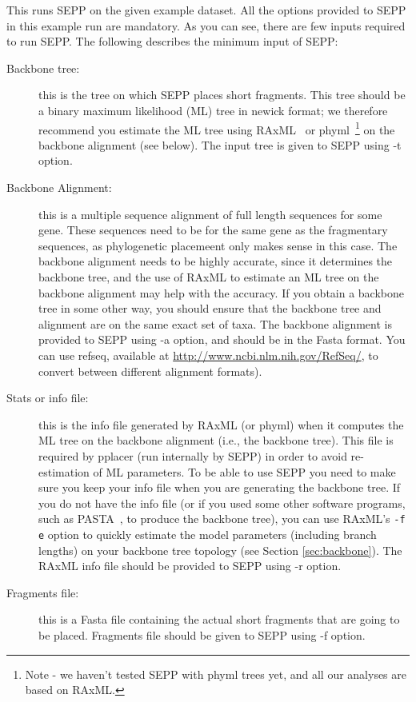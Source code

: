 \documentclass[11pt]{article} %
\newcommand{\sepp}{SEPP\xspace}
\newcommand{\ins}[1]{{\tt #1}}
\newcommand{\raxml}{RAxML\xspace}
\begin{document}
This runs \sepp on the given example dataset. All the options provided to \sepp in this example run are mandatory. As you can see, there are few inputs required to run \sepp. The following describes the minimum input of \sepp:
\begin {description}
\item[Backbone tree:] this is the tree on which \sepp places short fragments. 
This tree should be a binary maximum likelihood (ML) tree
in newick format; we therefore recommend you estimate
the ML tree  using \raxml~\cite{raxml} or phyml~\cite{phyml}\footnote{Note - we 
haven't tested \sepp with phyml trees yet, and all our analyses are
based on RAxML.}  on the backbone alignment (see below). The 
input tree is given to \sepp using -t option.
\item[Backbone Alignment:] this is a multiple sequence alignment 
of full length sequences for some gene. These sequences need to
be for the same gene as the fragmentary sequences, as phylogenetic
placemeent only makes sense in this case.  The backbone 
alignment needs to be highly accurate, since it determines the backbone
tree, and the use of RAxML to estimate an ML tree on the
backbone alignment may help with the accuracy.  If you obtain a
backbone tree in some other way, you should ensure that the
backbone tree and alignment  are on the same exact set of taxa.
The backbone alignment is provided to \sepp using -a option, and should be in 
the Fasta format. You can use  refseq, available  at 
\url{http://www.ncbi.nlm.nih.gov/RefSeq/}, to convert  between different alignment formats). 
\item[Stats or info file:] this is the info file generated by RAxML (or phyml) 
when it computes the ML tree on the backbone alignment (i.e., the
backbone tree). 
This file is required by  pplacer (run internally by \sepp) 
in order to avoid re-estimation of ML parameters. 
To be able to use \sepp you need to make sure you keep your 
info file when you are generating the backbone tree. 
If you do not have the info file (or if you used 
some other software programs, such as PASTA~\cite{pasta-jcb}, to produce the
backbone tree), you can use RAxML's \ins{-f e} option to quickly 
estimate the model parameters (including branch lengths) on your 
backbone tree topology (see Section \ref{sec:backbone}). 
The RAxML info file should be provided to \sepp using -r option. 
\item[Fragments file:] this is a Fasta file containing the actual short fragments that are going to be placed. Fragments file should be given to \sepp using -f option. 
\end{description}
\end{document}
